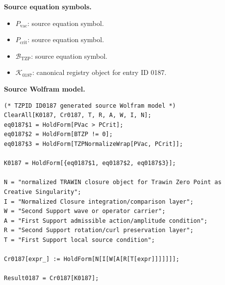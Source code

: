\begin{minipage}[t]{0.49\linewidth}
\begingroup
\small
\raggedright
\textbf{Source equation symbols.}\par
\begin{itemize}[leftmargin=1.35em,itemsep=1pt,topsep=1pt,parsep=0pt]
    \item $P_{\mathrm{vac}}$: source equation symbol.
    \item $P_{\mathrm{crit}}$: source equation symbol.
    \item $\mathcal{B}_{\mathrm{TZP}}$: source equation symbol.
    \item $\mathcal{K}_{0187}$: canonical registry object for entry ID 0187.
\end{itemize}
\endgroup
\end{minipage}\hfill
\begin{minipage}[t]{0.47\linewidth}
\begingroup
\scriptsize
\raggedright
\textbf{Source Wolfram model.}\par
\begin{Verbatim}[fontsize=\tiny,breaklines=true,breakanywhere=true]
(* TZPID ID0187 generated source Wolfram model *)
ClearAll[K0187, Cr0187, T, R, A, W, I, N];
eq0187$1 = HoldForm[PVac > PCrit];
eq0187$2 = HoldForm[BTZP != 0];
eq0187$3 = HoldForm[TZPNormalizeWrap[PVac, PCrit]];

K0187 = HoldForm[{eq0187$1, eq0187$2, eq0187$3}];

N = "normalized TRAWIN closure object for Trawin Zero Point as Creative Singularity";
I = "Normalized Closure integration/comparison layer";
W = "Second Support wave or operator carrier";
A = "First Support admissible action/amplitude condition";
R = "Second Support rotation/curl preservation layer";
T = "First Support local source condition";

Cr0187[expr_] := HoldForm[N[I[W[A[R[T[expr]]]]]]];

Result0187 = Cr0187[K0187];
\end{Verbatim}
\endgroup
\end{minipage}

